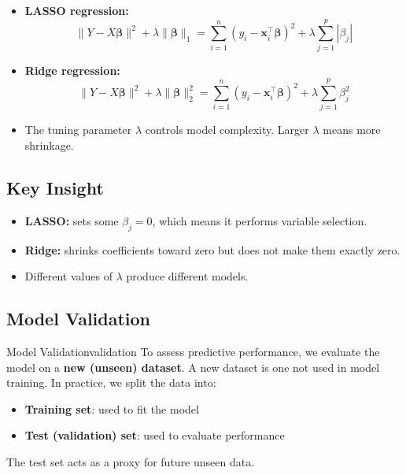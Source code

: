 \begin{keyresult}
\begin{itemize}
\item \textbf{LASSO regression:}
\[
\|Y - X\boldsymbol{\beta}\|^2 + \lambda \|\boldsymbol{\beta}\|_1
= \sum_{i=1}^{n} (y_i - \mathbf{x}_i^\top \boldsymbol{\beta})^2 + \lambda \sum_{j=1}^{p} |\beta_j|
\]

\item \textbf{Ridge regression:}
\[
\|Y - X\boldsymbol{\beta}\|^2 + \lambda \|\boldsymbol{\beta}\|_2^2
= \sum_{i=1}^{n} (y_i - \mathbf{x}_i^\top \boldsymbol{\beta})^2 + \lambda \sum_{j=1}^{p} \beta_j^2
\]

\item The tuning parameter $\lambda$ controls model complexity. Larger $\lambda$ means more shrinkage.
\end{itemize}
\end{keyresult}

\subsection{Key Insight}

\begin{notebox}
\begin{itemize}
\item \textbf{LASSO:} sets some $\beta_j = 0$, which means it performs variable selection.

\item \textbf{Ridge:} shrinks coefficients toward zero but does not make them exactly zero.

\item Different values of $\lambda$ produce different models.
\end{itemize}
\end{notebox}

\subsection{Model Validation}

\begin{defn}{Model Validation}{validation}
To assess predictive performance, we evaluate the model on a \textbf{new (unseen) dataset}. A new dataset is one not used in model training. In practice, we split the data into:
\begin{itemize}
\item \textbf{Training set}: used to fit the model
\item \textbf{Test (validation) set}: used to evaluate performance
\end{itemize}
The test set acts as a proxy for future unseen data.
\end{defn}

